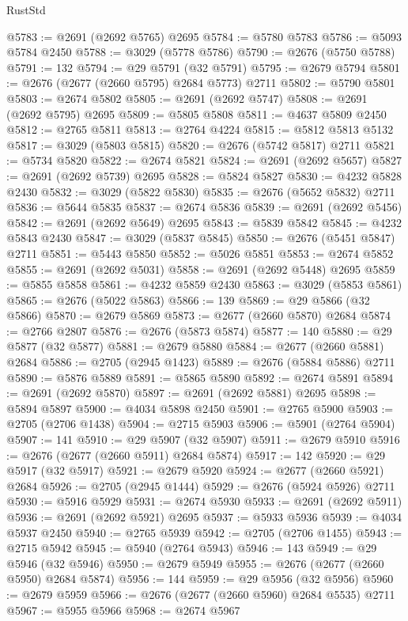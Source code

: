\begin{lexlean}{RustStd}
\begin{coremodule}
@5783 := @2691 (@2692 @5765) @2695
@5784 := @5780 @5783
@5786 := @5093 @5784 @2450
@5788 := @3029 (@5778 @5786)
@5790 := @2676 (@5750 @5788)
@5791 := 132
@5794 := @29 @5791 (@32 @5791)
@5795 := @2679 @5794
@5801 := @2676 (@2677 (@2660 @5795) @2684 @5773) @2711
@5802 := @5790 @5801
@5803 := @2674 @5802
@5805 := @2691 (@2692 @5747)
@5808 := @2691 (@2692 @5795) @2695
@5809 := @5805 @5808
@5811 := @4637 @5809 @2450
@5812 := @2765 @5811
@5813 := @2764 @4224
@5815 := @5812 @5813 @5132
@5817 := @3029 (@5803 @5815)
@5820 := @2676 (@5742 @5817) @2711
@5821 := @5734 @5820
@5822 := @2674 @5821
@5824 := @2691 (@2692 @5657)
@5827 := @2691 (@2692 @5739) @2695
@5828 := @5824 @5827
@5830 := @4232 @5828 @2430
@5832 := @3029 (@5822 @5830)
@5835 := @2676 (@5652 @5832) @2711
@5836 := @5644 @5835
@5837 := @2674 @5836
@5839 := @2691 (@2692 @5456)
@5842 := @2691 (@2692 @5649) @2695
@5843 := @5839 @5842
@5845 := @4232 @5843 @2430
@5847 := @3029 (@5837 @5845)
@5850 := @2676 (@5451 @5847) @2711
@5851 := @5443 @5850
@5852 := @5026 @5851
@5853 := @2674 @5852
@5855 := @2691 (@2692 @5031)
@5858 := @2691 (@2692 @5448) @2695
@5859 := @5855 @5858
@5861 := @4232 @5859 @2430
@5863 := @3029 (@5853 @5861)
@5865 := @2676 (@5022 @5863)
@5866 := 139
@5869 := @29 @5866 (@32 @5866)
@5870 := @2679 @5869
@5873 := @2677 (@2660 @5870) @2684
@5874 := @2766 @2807
@5876 := @2676 (@5873 @5874)
@5877 := 140
@5880 := @29 @5877 (@32 @5877)
@5881 := @2679 @5880
@5884 := @2677 (@2660 @5881) @2684
@5886 := @2705 (@2945 @1423)
@5889 := @2676 (@5884 @5886) @2711
@5890 := @5876 @5889
@5891 := @5865 @5890
@5892 := @2674 @5891
@5894 := @2691 (@2692 @5870)
@5897 := @2691 (@2692 @5881) @2695
@5898 := @5894 @5897
@5900 := @4034 @5898 @2450
@5901 := @2765 @5900
@5903 := @2705 (@2706 @1438)
@5904 := @2715 @5903
@5906 := @5901 (@2764 @5904)
@5907 := 141
@5910 := @29 @5907 (@32 @5907)
@5911 := @2679 @5910
@5916 := @2676 (@2677 (@2660 @5911) @2684 @5874)
@5917 := 142
@5920 := @29 @5917 (@32 @5917)
@5921 := @2679 @5920
@5924 := @2677 (@2660 @5921) @2684
@5926 := @2705 (@2945 @1444)
@5929 := @2676 (@5924 @5926) @2711
@5930 := @5916 @5929
@5931 := @2674 @5930
@5933 := @2691 (@2692 @5911)
@5936 := @2691 (@2692 @5921) @2695
@5937 := @5933 @5936
@5939 := @4034 @5937 @2450
@5940 := @2765 @5939
@5942 := @2705 (@2706 @1455)
@5943 := @2715 @5942
@5945 := @5940 (@2764 @5943)
@5946 := 143
@5949 := @29 @5946 (@32 @5946)
@5950 := @2679 @5949
@5955 := @2676 (@2677 (@2660 @5950) @2684 @5874)
@5956 := 144
@5959 := @29 @5956 (@32 @5956)
@5960 := @2679 @5959
@5966 := @2676 (@2677 (@2660 @5960) @2684 @5535) @2711
@5967 := @5955 @5966
@5968 := @2674 @5967

\end{coremodule}
\end{lexlean}
